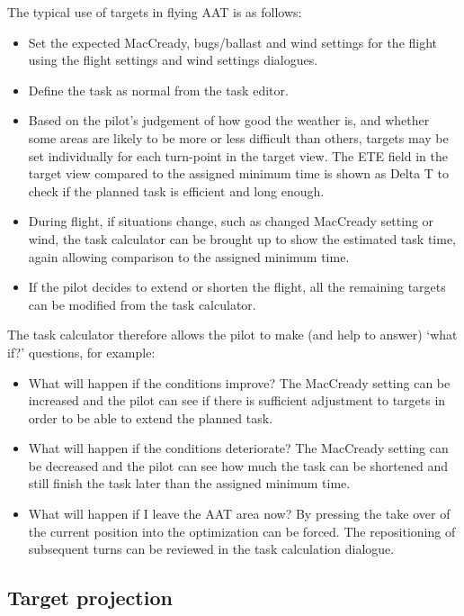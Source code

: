 The typical use of targets in flying AAT is as follows:
\begin{itemize}
\item Set the expected MacCready, bugs/ballast and wind settings
  for the flight using the flight settings and wind settings dialogues.
\item Define the task as normal from the task editor.
\item Based on the pilot's judgement of how good the weather is,
  and whether some areas are likely to be more or less difficult than
  others, targets may be set individually for each turn-point in the
  target view.  The ETE field in the target view compared to
  the assigned minimum time is shown as Delta T to check if the planned 
  task is efficient and long enough.
\item During flight, if situations change, such as changed MacCready setting
  or wind, the task calculator can be brought up to show the estimated
  task time, again allowing comparison to the assigned minimum time.
\item If the pilot decides to extend or shorten the flight, all the remaining
  targets can be modified from the task calculator. 
\end{itemize}

The task calculator therefore allows the pilot to make (and help to
answer) `what if?' questions, for example:
\begin{itemize}
\item What will happen if the conditions improve?  The MacCready setting can be 
increased and the pilot can see if there is sufficient adjustment to targets in 
order to be able to extend the planned task.
\item What will happen if the conditions deteriorate?  The MacCready setting can 
be decreased and the pilot can see how much the task can be shortened and still 
finish the task later than the assigned minimum time.
\item What will happen if I leave the AAT area now?  By pressing  the take over of the current position into the optimization can
be forced. The repositioning of subsequent turns can be reviewed in the task calculation
dialogue.
\end{itemize}

\subsection*{Target projection}

